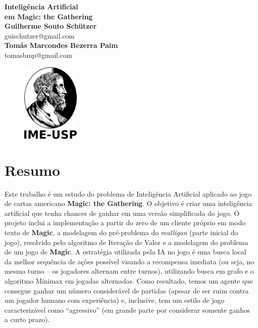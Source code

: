 \documentclass[dvipsnames, openany]{book}
\begin{document}
  \begin{titlepage}
  \begin{center}
   {\huge\bfseries Inteligência Artificial \\ em \textbf{Magic: the Gathering}\\}
   \vspace{1.5cm}
   {\bfseries Guilherme Souto Schützer}\\[5pt]
   guischutzer@gmail.com\\[14pt]
   \vspace{0.5cm}
   {\bfseries Tomás Marcondes Bezerra Paim}\\[5pt]
   tomasbmp@gmail.com\\[14pt]
   \vspace{2cm}
  {\begin{figure}[!h]
          \centering
              \includegraphics[width=0.25\textwidth]{picstcc/ime.png}
  \end{figure}}
   \vspace{0.4cm}
 \end{center}
  \end{titlepage}

\chapter*{Resumo}
Este trabalho é um estudo do problema de Inteligência Artificial aplicado ao jogo de cartas americano \textbf{Magic: the Gathering}. O objetivo é criar uma inteligência artificial que tenha chances de ganhar em uma versão simplificada do jogo. O projeto inclui a implementação a partir do zero de um cliente próprio em modo texto de \textbf{Magic}, a modelagem do pré-problema do \textit{mulligan} (parte inicial do jogo), resolvido pelo algoritmo de Iteração de Valor e a modelagem do problema de um jogo de \textbf{Magic}. A estratégia utilizada pela IA no jogo é uma busca local da melhor sequência de ações possível visando a recompensa imediata (ou seja, no mesmo turno -- os jogadores alternam entre turnos), utilizando busca em grafo e o algoritmo Minimax em jogadas alternadas. Como resultado, temos um agente que consegue ganhar um número considerável de partidas (apesar de ser ruim contra um jogador humano com experiência) e, inclusive, tem um estilo de jogo caracterizável como ``agressivo'' (em grande parte por considerar somente ganhos a curto prazo).
\end{document}
